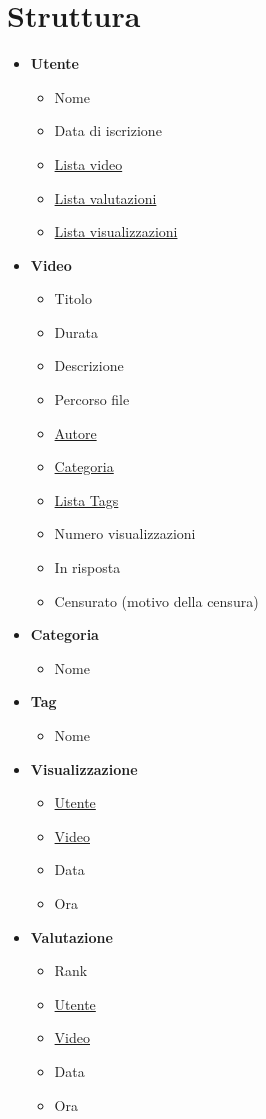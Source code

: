 \section{Struttura}
\begin{minipage}[t]{0.5\textwidth}
	\begin{itemize}
		\item \textbf{Utente}
		\begin{itemize}
			\item Nome
			\item Data di iscrizione
			\item \underline{Lista video}
			\item \underline{Lista valutazioni}
			\item \underline{Lista visualizzazioni}
		\end{itemize}
		\item \textbf{Video}
		\begin{itemize}
			\item Titolo
			\item Durata
			\item Descrizione
			\item Percorso file
			\item \underline{Autore}
			\item \underline{Categoria}
			\item \underline{Lista Tags}
			\item Numero visualizzazioni
			\item In risposta
			\item Censurato (motivo della censura)
		\end{itemize}
		\item \textbf{Categoria}
		\begin{itemize}
			\item Nome
		\end{itemize}
		\item \textbf{Tag}
		\begin{itemize}
			\item Nome
		\end{itemize}
		\item \textbf{Visualizzazione}
		\begin{itemize}
			\item \underline{Utente}
			\item \underline{Video}
			\item Data
			\item Ora
		\end{itemize}
		\item \textbf{Valutazione}
		\begin{itemize}
			\item Rank
			\item \underline{Utente}
			\item \underline{Video}
			\item Data
			\item Ora
		\end{itemize}
	\end{itemize}
\end{minipage}
